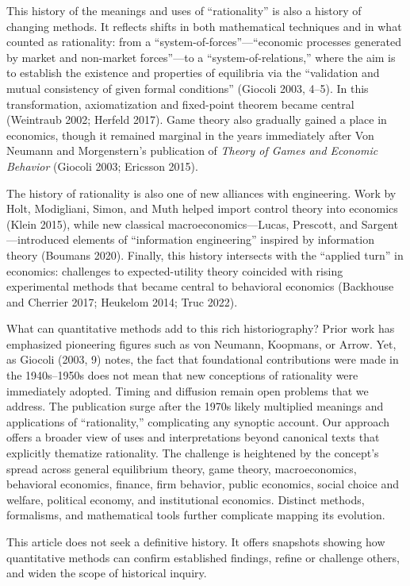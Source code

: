 \documentclass[
]{interact}
\begin{document}
This history of the meanings and uses of ``rationality'' is also a
history of changing methods. It reflects shifts in both mathematical
techniques and in what counted as rationality: from a
``system-of-forces''---``economic processes generated by market and
non-market forces''---to a ``system-of-relations,'' where the aim is to
establish the existence and properties of equilibria via the
``validation and mutual consistency of given formal conditions''
(Giocoli 2003, 4--5). In this transformation, axiomatization and
fixed-point theorem became central (Weintraub 2002; Herfeld 2017). Game
theory also gradually gained a place in economics, though it remained
marginal in the years immediately after Von Neumann and Morgenstern's
publication of \emph{Theory of Games and Economic Behavior} (Giocoli
2003; Ericsson 2015).

The history of rationality is also one of new alliances with
engineering. Work by Holt, Modigliani, Simon, and Muth helped import
control theory into economics (Klein 2015), while new classical
macroeconomics---Lucas, Prescott, and Sargent---introduced elements of
``information engineering'' inspired by information theory (Boumans
2020). Finally, this history intersects with the ``applied turn'' in
economics: challenges to expected-utility theory coincided with rising
experimental methods that became central to behavioral economics
(Backhouse and Cherrier 2017; Heukelom 2014; Truc 2022).

What can quantitative methods add to this rich historiography? Prior
work has emphasized pioneering figures such as von Neumann, Koopmans, or
Arrow. Yet, as Giocoli (2003, 9) notes, the fact that foundational
contributions were made in the 1940s--1950s does not mean that new
conceptions of rationality were immediately adopted. Timing and
diffusion remain open problems that we address. The publication surge
after the 1970s likely multiplied meanings and applications of
``rationality,'' complicating any synoptic account. Our approach offers
a broader view of uses and interpretations beyond canonical texts that
explicitly thematize rationality. The challenge is heightened by the
concept's spread across general equilibrium theory, game theory,
macroeconomics, behavioral economics, finance, firm behavior, public
economics, social choice and welfare, political economy, and
institutional economics. Distinct methods, formalisms, and mathematical
tools further complicate mapping its evolution.

This article does not seek a definitive history. It offers snapshots
showing how quantitative methods can confirm established findings,
refine or challenge others, and widen the scope of historical inquiry.
\end{document}
